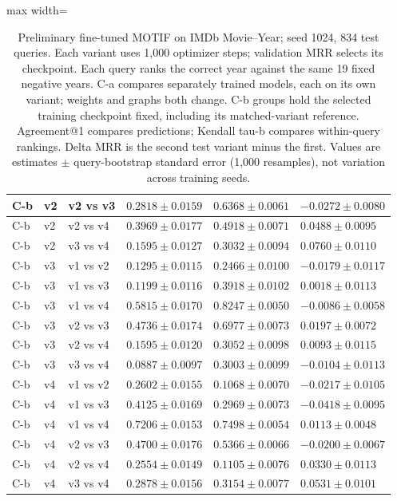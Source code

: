 \begin{table}[htbp]
\begin{adjustbox}{max width=\linewidth}
\begin{tabular}{|l|l|l|l|l|l|}
\hline
C-b & v2 & v2 vs v3 & $0.2818 \pm 0.0159$ & $0.6368 \pm 0.0061$ & $-0.0272 \pm 0.0080$ \\
\hline
C-b & v2 & v2 vs v4 & $0.3969 \pm 0.0177$ & $0.4918 \pm 0.0071$ & $0.0488 \pm 0.0095$ \\
\hline
C-b & v2 & v3 vs v4 & $0.1595 \pm 0.0127$ & $0.3032 \pm 0.0094$ & $0.0760 \pm 0.0110$ \\
\hline
C-b & v3 & v1 vs v2 & $0.1295 \pm 0.0115$ & $0.2466 \pm 0.0100$ & $-0.0179 \pm 0.0117$ \\
\hline
C-b & v3 & v1 vs v3 & $0.1199 \pm 0.0116$ & $0.3918 \pm 0.0102$ & $0.0018 \pm 0.0113$ \\
\hline
C-b & v3 & v1 vs v4 & $0.5815 \pm 0.0170$ & $0.8247 \pm 0.0050$ & $-0.0086 \pm 0.0058$ \\
\hline
C-b & v3 & v2 vs v3 & $0.4736 \pm 0.0174$ & $0.6977 \pm 0.0073$ & $0.0197 \pm 0.0072$ \\
\hline
C-b & v3 & v2 vs v4 & $0.1595 \pm 0.0120$ & $0.3052 \pm 0.0098$ & $0.0093 \pm 0.0115$ \\
\hline
C-b & v3 & v3 vs v4 & $0.0887 \pm 0.0097$ & $0.3003 \pm 0.0099$ & $-0.0104 \pm 0.0113$ \\
\hline
C-b & v4 & v1 vs v2 & $0.2602 \pm 0.0155$ & $0.1068 \pm 0.0070$ & $-0.0217 \pm 0.0105$ \\
\hline
C-b & v4 & v1 vs v3 & $0.4125 \pm 0.0169$ & $0.2969 \pm 0.0073$ & $-0.0418 \pm 0.0095$ \\
\hline
C-b & v4 & v1 vs v4 & $0.7206 \pm 0.0153$ & $0.7498 \pm 0.0054$ & $0.0113 \pm 0.0048$ \\
\hline
C-b & v4 & v2 vs v3 & $0.4700 \pm 0.0176$ & $0.5366 \pm 0.0066$ & $-0.0200 \pm 0.0067$ \\
\hline
C-b & v4 & v2 vs v4 & $0.2554 \pm 0.0149$ & $0.1105 \pm 0.0076$ & $0.0330 \pm 0.0113$ \\
\hline
C-b & v4 & v3 vs v4 & $0.2878 \pm 0.0156$ & $0.3154 \pm 0.0077$ & $0.0531 \pm 0.0101$ \\
\hline
\end{tabular}
\end{adjustbox}
\caption{Preliminary fine-tuned MOTIF on IMDb Movie--Year; seed 1024, 834 test queries. Each variant uses 1,000 optimizer steps; validation MRR selects its checkpoint. Each query ranks the correct year against the same 19 fixed negative years. C-a compares separately trained models, each on its own variant; weights and graphs both change. C-b groups hold the selected training checkpoint fixed, including its matched-variant reference. Agreement@1 compares predictions; Kendall tau-b compares within-query rankings. Delta MRR is the second test variant minus the first. Values are estimates $\pm$ query-bootstrap standard error (1,000 resamples), not variation across training seeds.}
\label{tab:motif-imdb-movie-year-matrix-invariance}
\end{table}
